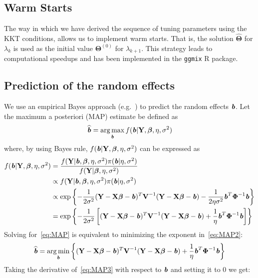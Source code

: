 \documentclass[12pt,letter]{article}\usepackage[]{graphicx}\usepackage[]{color}
\newcommand{\bX}{\textbf{X}}
\newcommand{\bY}{\textbf{Y}}
\newcommand{\bV}{\textbf{V}}
\newcommand{\bb}{\textbf{\emph{b}}}
\newcommand{\bTheta}{\boldsymbol{\Theta}}
\newcommand{\bbeta}{\boldsymbol{\beta}}
\newcommand{\bPhi}{\boldsymbol{\Phi}}
\DeclareMathOperator*{\argmin}{arg\,min}
\DeclareMathOperator*{\argmax}{arg\,max}
\begin{document}
\subsection{Warm Starts}
The way in which we have derived the sequence of tuning parameters using the KKT conditions, allows us to implement warm starts. That is, the solution $\widehat{\bTheta}$ for $\lambda_k$ is used as the initial value $\bTheta^{(0)}$ for $\lambda_{k+1}$. This strategy leads to computational speedups and has been implemented in the \texttt{ggmix} R package. 

\subsection{Prediction of the random effects}
We use an empirical Bayes approach (e.g.~\cite{wakefield2013bayesian}) to predict the random effects $\bb$. Let the maximum a posteriori (MAP) estimate be defined as
\begin{equation}
	\widehat{\bb} = \argmax_{\bb} f(\bb |  \bY, \bbeta, \eta, \sigma^2)  \label{eq:MAP}
\end{equation}
where, by using Bayes rule, $f(\bb |  \bY, \bbeta, \eta, \sigma^2)$ can be expressed as
\begin{align}
	f(\bb |  \bY, \bbeta, \eta, \sigma^2) & = \frac{f(\bY | \bb,  \bbeta, \eta, \sigma^2)  \pi(\bb | \eta, \sigma^2)}{f(\bY |  \bbeta, \eta, \sigma^2)} \nonumber \\
	& \propto f(\bY | \bb,  \bbeta, \eta, \sigma^2)  \pi(\bb | \eta, \sigma^2) \nonumber\\
	& \propto \exp \left\lbrace - \frac{1}{2 \sigma^2} (\bY - \bX \bbeta - \bb)^T \bV^{-1} (\bY - \bX \bbeta - \bb) - \frac{1}{2\eta \sigma^2}\bb^T \bPhi^{-1}\bb   \right \rbrace \nonumber\\
	& = \exp \left\lbrace - \frac{1}{2 \sigma^2} \left[  (\bY - \bX \bbeta - \bb)^T \bV^{-1} (\bY - \bX \bbeta - \bb) + \frac{1}{\eta }\bb^T \bPhi^{-1}\bb \right]    \right \rbrace \label{eq:MAP2}
\end{align}
Solving for~\eqref{eq:MAP} is equivalent to minimizing the exponent in~\eqref{eq:MAP2}:
\begin{align}
	\widehat{\bb} = \argmin_{\bb} \left\lbrace  (\bY - \bX \bbeta - \bb)^T \bV^{-1} (\bY - \bX \bbeta - \bb) + \frac{1}{\eta }\bb^T \bPhi^{-1}\bb \right\rbrace \label{eq:MAP3}
\end{align}
Taking the derivative of~\eqref{eq:MAP3} with respect to $\bb$ and setting it to 0 we get:
\end{document}
